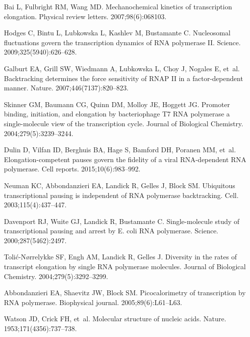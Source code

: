 \documentclass[10pt,letterpaper]{article}
\begin{document}
{{\begin{thebibliography}{10}
Bai L, Fulbright RM, Wang MD.
\newblock Mechanochemical kinetics of transcription elongation.
\newblock Physical review letters. 2007;98(6):068103.

Hodges C, Bintu L, Lubkowska L, Kashlev M, Bustamante C.
\newblock Nucleosomal fluctuations govern the transcription dynamics of RNA
  polymerase II.
\newblock Science. 2009;325(5940):626--628.

Galburt EA, Grill SW, Wiedmann A, Lubkowska L, Choy J, Nogales E, et~al.
\newblock Backtracking determines the force sensitivity of RNAP II in a
  factor-dependent manner.
\newblock Nature. 2007;446(7137):820--823.

Skinner GM, Baumann CG, Quinn DM, Molloy JE, Hoggett JG.
\newblock Promoter binding, initiation, and elongation by bacteriophage T7 RNA
  polymerase a single-molecule view of the transcription cycle.
\newblock Journal of Biological Chemistry. 2004;279(5):3239--3244.

Dulin D, Vilfan ID, Berghuis BA, Hage S, Bamford DH, Poranen MM, et~al.
\newblock Elongation-competent pauses govern the fidelity of a viral
  RNA-dependent RNA polymerase.
\newblock Cell reports. 2015;10(6):983--992.

Neuman KC, Abbondanzieri EA, Landick R, Gelles J, Block SM.
\newblock Ubiquitous transcriptional pausing is independent of RNA polymerase
  backtracking.
\newblock Cell. 2003;115(4):437--447.

Davenport RJ, Wuite GJ, Landick R, Bustamante C.
\newblock Single-molecule study of transcriptional pausing and arrest by E.
  coli RNA polymerase.
\newblock Science. 2000;287(5462):2497.

Toli{\'c}-N{\o}rrelykke SF, Engh AM, Landick R, Gelles J.
\newblock Diversity in the rates of transcript elongation by single RNA
  polymerase molecules.
\newblock Journal of Biological Chemistry. 2004;279(5):3292--3299.

Abbondanzieri EA, Shaevitz JW, Block SM.
\newblock Picocalorimetry of transcription by RNA polymerase.
\newblock Biophysical journal. 2005;89(6):L61--L63.

Watson JD, Crick FH, et~al.
\newblock Molecular structure of nucleic acids.
\newblock Nature. 1953;171(4356):737--738.


\end{thebibliography}}}
\end{document}
